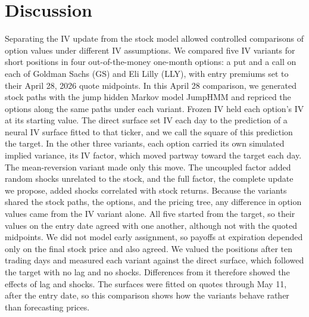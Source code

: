 \section{Discussion}\label{sec:discussion}

Separating the IV update from the stock model allowed controlled comparisons of option values under different IV assumptions. We compared five IV variants for short positions in four out-of-the-money one-month options: a put and a call on each of Goldman Sachs (GS) and Eli Lilly (LLY), with entry premiums set to their April 28, 2026 quote midpoints. In this April 28 comparison, we generated stock paths with the jump hidden Markov model JumpHMM and repriced the options along the same paths under each variant. Frozen IV held each option's IV at its starting value. The direct surface set IV each day to the prediction of a neural IV surface fitted to that ticker, and we call the square of this prediction the target. In the other three variants, each option carried its own simulated implied variance, its IV factor, which moved partway toward the target each day. The mean-reversion variant made only this move. The uncoupled factor added random shocks unrelated to the stock, and the full factor, the complete update we propose, added shocks correlated with stock returns. Because the variants shared the stock paths, the options, and the pricing tree, any difference in option values came from the IV variant alone. All five started from the target, so their values on the entry date agreed with one another, although not with the quoted midpoints. We did not model early assignment, so payoffs at expiration depended only on the final stock price and also agreed. We valued the positions after ten trading days and measured each variant against the direct surface, which followed the target with no lag and no shocks. Differences from it therefore showed the effects of lag and shocks. The surfaces were fitted on quotes through May 11, after the entry date, so this comparison shows how the variants behave rather than forecasting prices.

